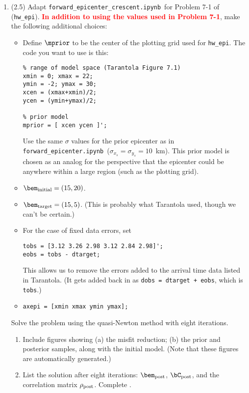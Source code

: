 \documentclass[11pt,titlepage,fleqn]{article}
\newcommand{\tfileFE}{{\tt forward\_epicenter.ipynb}}
\newcommand{\tfileFEC}{{\tt forward\_epicenter\_crescent.ipynb}}
\begin{document}
\begin{enumerate}

\item (2.5) Adapt \tfileFEC\ for Problem 7-1 of \citet{Tarantola2005} (\verb+hw_epi+). \textcolor{red}{\bf In addition to using the values used in Problem 7-1}, make the following additional choices:
%
\begin{itemize}
\item Define $\mprior$ to be the center of the plotting grid used for \verb+hw_epi+. The code you want to use is this:
%
\begin{verbatim}
% range of model space (Tarantola Figure 7.1)
xmin = 0; xmax = 22;
ymin = -2; ymax = 30;
xcen = (xmax+xmin)/2;
ycen = (ymin+ymax)/2;

% prior model
mprior = [ xcen ycen ]';
\end{verbatim}
%
Use the same $\sigma$ values for the prior epicenter as in \tfileFE\ ($\sigma_{x_s} = \sigma_{y_s} = 10$~km). This prior model is chosen as an analog for the perspective that the epicenter could be anywhere within a large region (such as the plotting grid).

\item $\bem_{\rm initial} = (15, 20)$.

\item $\bem_{\rm target} = (15, 5)$. (This is probably what Tarantola used, though we can't be certain.)

\item For the case of fixed data errors, set
%
\begin{verbatim}
tobs = [3.12 3.26 2.98 3.12 2.84 2.98]';
eobs = tobs - dtarget;
\end{verbatim}
%
This allows us to remove the errors added to the arrival time data listed in Tarantola. (It gets added back in as {\tt dobs = dtarget + eobs}, which is \verb+tobs+.)

\item \verb+axepi = [xmin xmax ymin ymax];+

\end{itemize}

Solve the problem using the quasi-Newton method with eight iterations.
%
\begin{enumerate}
\item Include figures showing (a) the misfit reduction; (b) the prior and posterior samples, along with the initial model. (Note that these figures are automatically generated.)

\item List the solution after eight iterations: $\bem_{\rm post}$, $\bC_{\rm post}$, and the correlation matrix $\rho_{\rm post}$. Complete . 


\end{enumerate}
\end{enumerate}
\end{document}

